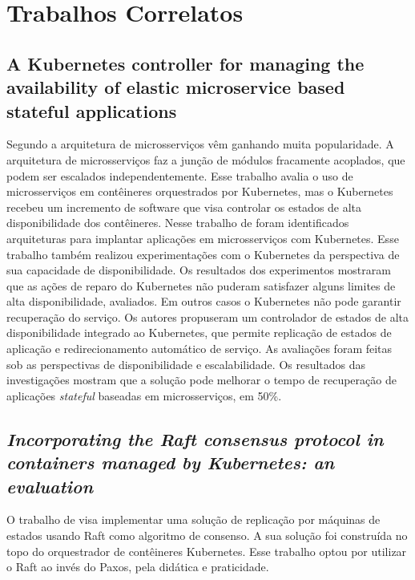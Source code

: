 \documentclass[12pt]{article}
\begin{document}
\section{Trabalhos Correlatos}

\subsection{A Kubernetes controller for managing the availability of elastic microservice based stateful applications}

Segundo \cite{vayghan2021kubernetes} a arquitetura de microsserviços vêm ganhando muita popularidade. A arquitetura de microsserviços faz a junção de módulos fracamente acoplados, que podem ser escalados independentemente. Esse trabalho avalia o uso de microsserviços em contêineres orquestrados por Kubernetes, mas o Kubernetes recebeu um incremento de software que visa controlar os estados de alta disponibilidade dos contêineres. Nesse trabalho de \cite{vayghan2021kubernetes} foram identificados arquiteturas para implantar aplicações em microsserviços com Kubernetes. Esse trabalho também realizou experimentações com o Kubernetes da perspectiva de sua capacidade de disponibilidade. Os resultados dos experimentos mostraram que as ações de reparo do Kubernetes não puderam satisfazer alguns limites de alta disponibilidade, avaliados. Em outros casos o Kubernetes não pode garantir recuperação do serviço. Os autores propuseram um controlador de estados de alta disponibilidade integrado ao Kubernetes, que permite replicação de estados de aplicação e redirecionamento automático de serviço. As avaliações foram feitas sob as perspectivas de disponibilidade e escalabilidade. Os resultados das investigações mostram que a solução pode melhorar o tempo de recuperação de aplicações \textit{stateful} baseadas em microsserviços, em 50\%.

\subsection{\textit{Incorporating the Raft consensus protocol in containers managed by Kubernetes: an evaluation}}

O trabalho de \cite{netto2020incorporating} visa implementar uma solução de replicação por máquinas de estados usando Raft como algoritmo de consenso. A sua solução foi construída no topo do orquestrador de contêineres Kubernetes. Esse trabalho optou por utilizar o Raft ao invés do Paxos, pela didática e praticidade.
\end{document}
